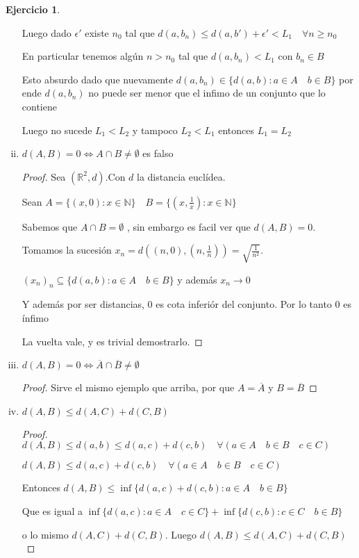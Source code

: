 \documentclass[12pt]{report}
\newcommand{\R}{\mathbb{R}}
\newcommand{\N}{\mathbb{N}}
\newcommand{\ra}{\rightarrow}
\newcommand{\ol}{\overline}
\theoremstyle{definition}
\newtheorem{ej}{Ejercicio}
\begin{document}
\begin{ej}
\begin{enumerate}[i)]
  Luego dado $\epsilon '$ existe $n_0$ tal que $d(a,b_n) \leq d(a,b') + \epsilon ' < L_1\quad \forall n \geq n_0$

  En particular tenemos algún $n > n_0$ tal que $d(a,b_n) < L_1$ con $b_n \in B$ 

  Esto absurdo dado que nuevamente $d(a,b_n) \in \{d(a,b) : a \in A \quad b \in B\}$ por ende $d(a,b_n)$ no puede ser menor que el infimo de un conjunto que lo contiene

Luego no sucede $L_1 < L_2 $ y tampoco $L_2 < L_1$ entonces $L_1 = L_2$
    \item $d(A,B) = 0 \iff A \cap B \neq \emptyset$ es falso
      \begin{proof}
	Sea $(\R^2,d)$.Con $d$ la distancia euclídea. 

	Sean $A = \{(x,0): x \in \N\} \quad B= \{(x,\frac{1}{x}): x \in \N \}$ 

	Sabemos que $A \cap B = \emptyset$ , sin embargo es facil ver que $d(A,B) = 0$. 

	Tomamos la sucesión $x_n = d((n,0), (n , \frac{1}{n})) = \sqrt{\frac{1}{n^2}}$. 
	
	$(x_n)_n \subseteq \{d(a,b) : a\in A \quad b \in B\}$ y además $x_n \ra 0$

	Y además por ser distancias, 0 es cota inferiór del conjunto. Por lo tanto $0$ es ínfimo

	La vuelta vale, y es trivial demostrarlo.

      \end{proof}
    \item $d(A,B) = 0 \iff \ol A \cap \ol B \neq \emptyset$
      \begin{proof}
	Sirve el mismo ejemplo que arriba, por que $A = \ol A$ y $B = \ol B$
      \end{proof}
    \item $d(A,B) \leq d(A,C) + d(C,B)$
      \begin{proof}
	$d(A,B)  \leq d(a,b) \leq d(a,c) + d(c,b) \quad \forall (a \in A \quad b \in B \quad c \in C)$

      $d(A,B) \leq d(a,c) + d(c,b) \quad \forall (a \in A \quad b \in B \quad c \in C)$ 

      Entonces $d(A,B) \leq \inf \{d(a,c) + d(c,b) : a \in A \quad b \in B\}$

      Que es igual a  $ \inf \{d(a,c) :  a \in A \quad c \in C\} + \inf \{d(c,b): c \in C \quad b \in B\}$

      o lo mismo $d(A,C) + d(C,B)$. Luego $d(A,B) \leq d(A,C) + d(C,B)$


\end{proof}
\end{enumerate}
\end{ej}
\end{document}
